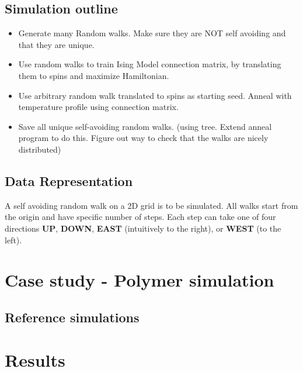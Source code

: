 \documentclass[11pt]{article}
\begin{document}
\subsection{Simulation outline}
\begin{itemize}
\item Generate many Random walks. Make sure they are NOT self avoiding and that they are unique.
\item Use random walks to train Ising Model connection matrix, by translating them to spins and maximize Hamiltonian.
\item Use arbitrary random walk translated to spins as starting seed. Anneal with temperature profile using connection matrix.
\item Save all unique self-avoiding random walks. (using tree. Extend anneal program to do this. Figure out way to check that the walks are nicely distributed)
\end{itemize}

\subsection{Data Representation}
A self avoiding random walk on a 2D grid is to be simulated. All walks start from the origin and have specific number of steps. Each step can take one of four directions \textbf{UP}, \textbf{DOWN}, \textbf{EAST} (intuitively to the right),  or \textbf{WEST} (to the left).
\section{Case study - Polymer simulation}
\subsection{Reference simulations}


\section{Results}


\end{document}
